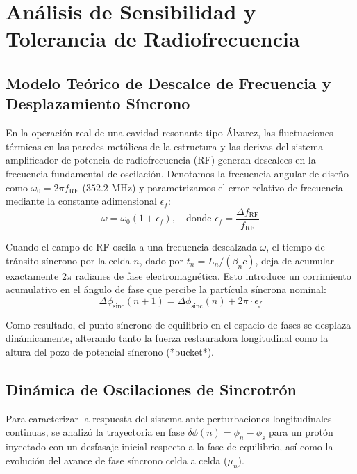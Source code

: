 \chapter{Análisis de Sensibilidad y Tolerancia de Radiofrecuencia}

\section{Modelo Teórico de Descalce de Frecuencia y Desplazamiento Síncrono}
En la operación real de una cavidad resonante tipo Álvarez, las fluctuaciones térmicas en las paredes metálicas de la estructura y las derivas del sistema amplificador de potencia de radiofrecuencia (RF) generan descalces en la frecuencia fundamental de oscilación. Denotamos la frecuencia angular de diseño como $\omega_0 = 2\pi f_{\text{RF}}$ ($352.2\text{ MHz}$) y parametrizamos el error relativo de frecuencia mediante la constante adimensional $\epsilon_f$:
\begin{equation}
\omega = \omega_0 (1 + \epsilon_f), \quad \text{donde } \epsilon_f = \frac{\Delta f_{\text{RF}}}{f_{\text{RF}}}
\end{equation}

Cuando el campo de RF oscila a una frecuencia descalzada $\omega$, el tiempo de tránsito síncrono por la celda $n$, dado por $t_n = L_n / (\beta_n c)$, deja de acumular exactamente $2\pi$ radianes de fase electromagnética. Esto introduce un corrimiento acumulativo en el ángulo de fase que percibe la partícula síncrona nominal:
\begin{equation}
\Delta\phi_{\text{sinc}} (n+1) = \Delta\phi_{\text{sinc}}(n) + 2\pi \cdot \epsilon_f
\end{equation}

Como resultado, el punto síncrono de equilibrio en el espacio de fases se desplaza dinámicamente, alterando tanto la fuerza restauradora longitudinal como la altura del pozo de potencial síncrono (*bucket*).

\section{Dinámica de Oscilaciones de Sincrotrón}
Para caracterizar la respuesta del sistema ante perturbaciones longitudinales continuas, se analizó la trayectoria en fase $\delta\phi(n) = \phi_n - \phi_s$ para un protón inyectado con un desfasaje inicial respecto a la fase de equilibrio, así como la evolución del avance de fase síncrono celda a celda ($\mu_n$).

